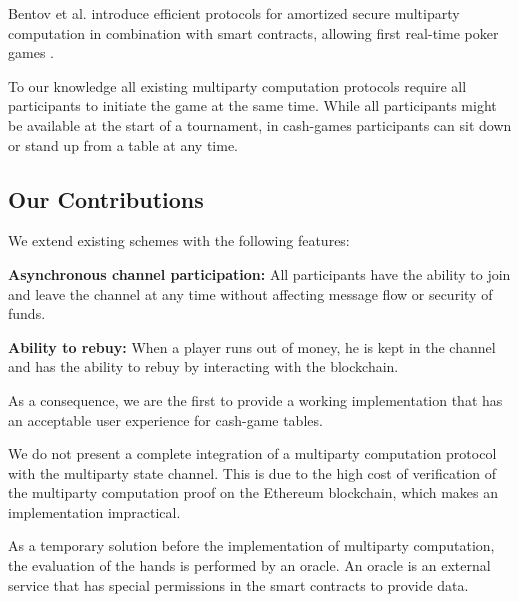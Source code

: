 Bentov et al. introduce efficient protocols for amortized secure multiparty computation in combination with smart contracts, allowing first real-time poker games \cite{bentov17}.

To our knowledge all existing multiparty computation protocols require all participants to initiate the game at the same time. While all participants might be available at the start of a tournament, in cash-games participants can sit down or stand up from a table at any time.

\subsection{Our Contributions}

We extend existing schemes with the following features:

\textbf{Asynchronous channel participation:} All participants have the ability to join and leave the channel at any time without affecting message flow or security of funds.

\textbf{Ability to rebuy:} When a player runs out of money, he is kept in the channel and has the ability to rebuy by interacting with the blockchain.

As a consequence, we are the first to provide a working implementation that has an acceptable user experience for cash-game tables.

We do not present a complete integration of a multiparty computation protocol with the multiparty state channel. This is due to the high cost of verification \cite{bentov17} of the multiparty computation proof on the Ethereum blockchain, which makes an implementation impractical.

As a temporary solution before the implementation of multiparty computation, the evaluation of the hands is performed by an oracle. An oracle is an external service that has special permissions in the smart contracts to provide data.
